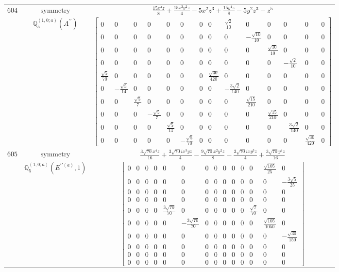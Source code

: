 \documentclass[fleqn,8pt,landscape]{jsarticle}
\begin{document}
\begin{longtable}{ccc}
$ 604 $ & $ \text{symmetry} $ & $ \frac{15 x^{4} z}{8} + \frac{15 x^{2} y^{2} z}{4} - 5 x^{2} z^{3} + \frac{15 y^{4} z}{8} - 5 y^{2} z^{3} + z^{5} $ \\
$  $ & $ \mathbb{Q}_{5}^{(1,0;a)}(A^{\prime\prime}) $ & $ \begin{bmatrix} 0 & 0 & 0 & 0 & 0 & 0 & 0 & 0 & \frac{\sqrt{2}}{10} & 0 & 0 & 0 & 0 & 0 \\ 0 & 0 & 0 & 0 & 0 & 0 & 0 & 0 & 0 & - \frac{\sqrt{10}}{10} & 0 & 0 & 0 & 0 \\ 0 & 0 & 0 & 0 & 0 & 0 & 0 & 0 & 0 & 0 & \frac{\sqrt{10}}{10} & 0 & 0 & 0 \\ 0 & 0 & 0 & 0 & 0 & 0 & 0 & 0 & 0 & 0 & 0 & - \frac{\sqrt{2}}{10} & 0 & 0 \\ \frac{\sqrt{5}}{70} & 0 & 0 & 0 & 0 & 0 & 0 & \frac{\sqrt{30}}{420} & 0 & 0 & 0 & 0 & 0 & 0 \\ 0 & - \frac{\sqrt{5}}{14} & 0 & 0 & 0 & 0 & 0 & 0 & - \frac{3 \sqrt{2}}{140} & 0 & 0 & 0 & 0 & 0 \\ 0 & 0 & \frac{\sqrt{5}}{7} & 0 & 0 & 0 & 0 & 0 & 0 & \frac{\sqrt{15}}{210} & 0 & 0 & 0 & 0 \\ 0 & 0 & 0 & - \frac{\sqrt{5}}{7} & 0 & 0 & 0 & 0 & 0 & 0 & \frac{\sqrt{15}}{210} & 0 & 0 & 0 \\ 0 & 0 & 0 & 0 & \frac{\sqrt{5}}{14} & 0 & 0 & 0 & 0 & 0 & 0 & - \frac{3 \sqrt{2}}{140} & 0 & 0 \\ 0 & 0 & 0 & 0 & 0 & - \frac{\sqrt{5}}{70} & 0 & 0 & 0 & 0 & 0 & 0 & \frac{\sqrt{30}}{420} & 0 \end{bmatrix} $ \\ \hline
$ 605 $ & $ \text{symmetry} $ & $ \frac{3 \sqrt{70} x^{4} z}{16} + \frac{3 \sqrt{70} i x^{3} y z}{4} - \frac{9 \sqrt{70} x^{2} y^{2} z}{8} - \frac{3 \sqrt{70} i x y^{3} z}{4} + \frac{3 \sqrt{70} y^{4} z}{16} $ \\
$  $ & $ \mathbb{Q}_{5}^{(1,0;a)}(E^{\prime\prime(a)},1) $ & $ \begin{bmatrix} 0 & 0 & 0 & 0 & 0 & 0 & 0 & 0 & 0 & 0 & 0 & 0 & \frac{\sqrt{105}}{25} & 0 \\ 0 & 0 & 0 & 0 & 0 & 0 & 0 & 0 & 0 & 0 & 0 & 0 & 0 & - \frac{3 \sqrt{5}}{25} \\ 0 & 0 & 0 & 0 & 0 & 0 & 0 & 0 & 0 & 0 & 0 & 0 & 0 & 0 \\ 0 & 0 & 0 & 0 & 0 & 0 & 0 & 0 & 0 & 0 & 0 & 0 & 0 & 0 \\ 0 & 0 & 0 & 0 & \frac{3 \sqrt{70}}{70} & 0 & 0 & 0 & 0 & 0 & 0 & \frac{\sqrt{7}}{70} & 0 & 0 \\ 0 & 0 & 0 & 0 & 0 & - \frac{3 \sqrt{70}}{70} & 0 & 0 & 0 & 0 & 0 & 0 & \frac{\sqrt{105}}{1050} & 0 \\ 0 & 0 & 0 & 0 & 0 & 0 & 0 & 0 & 0 & 0 & 0 & 0 & 0 & - \frac{\sqrt{30}}{150} \\ 0 & 0 & 0 & 0 & 0 & 0 & 0 & 0 & 0 & 0 & 0 & 0 & 0 & 0 \\ 0 & 0 & 0 & 0 & 0 & 0 & 0 & 0 & 0 & 0 & 0 & 0 & 0 & 0 \\ 0 & 0 & 0 & 0 & 0 & 0 & 0 & 0 & 0 & 0 & 0 & 0 & 0 & 0 \end{bmatrix} $ \\ \hline

\end{longtable}
\end{document}
